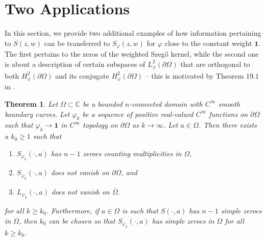 \documentclass[11pt, reqno]{amsart}
\newtheorem{thm}{Theorem}[section]
\numberwithin{equation}{section}
\begin{document}
\section{Two Applications}

In this section, we provide two additional examples of how information pertaining to $S(z, w)$ can be transferred to $S_{\varphi}(z, w)$ for $\varphi$ close to the constant weight $\mathbf 1$. The first pertains to the zeros of the weighted Szeg\H{o} kernel, while the second one is about a description of certain subspaces of $L^2_{\varphi}(\partial \Omega)$ that are orthogonal to both $H^2_{\varphi}(\partial \Omega)$ and its conjugate $\overline{H^2_{\varphi}(\partial \Omega)}$ -- this is motivated by Theorem $19.1$ in \cite{Be0}.

\begin{thm}\label{Zero 1}
Let $\Omega\subset\mathbb{C}$ be a bounded $n$-connected domain with $C^{\infty}$ smooth boundary curves. Let $\varphi_k$ be a sequence of positive real-valued $C^{\infty}$ functions on $\partial\Omega$ such that $\varphi_k\rightarrow \mathbf{1}$ in $C^{\infty}$ topology on $\partial\Omega$ as $k\rightarrow\infty$. Let $a\in\Omega$. Then there exists a $k_0 \ge 1$ such that
\begin{enumerate}
    \item $S_{\varphi_k}(\cdot,a)$ has $n-1$ zeroes counting multiplicities in $\Omega$,
    \item $S_{\varphi_k}(\cdot,a)$ does not vanish on $\partial\Omega$, and
    \item $L_{\varphi_k}(\cdot,a)$ does not vanish on $\overline{\Omega}$.
\end{enumerate}
for all $k\geq k_0$. Furthermore, if $a \in \Omega$ is such that $S(\cdot,a)$ has $n-1$ simple zeroes in $\Omega$, then $k_0$ can be chosen so that $S_{\varphi_k}(\cdot,a)$ has simple zeroes in $\Omega$ for all $k\geq k_0$.
\end{thm}
\end{document}
